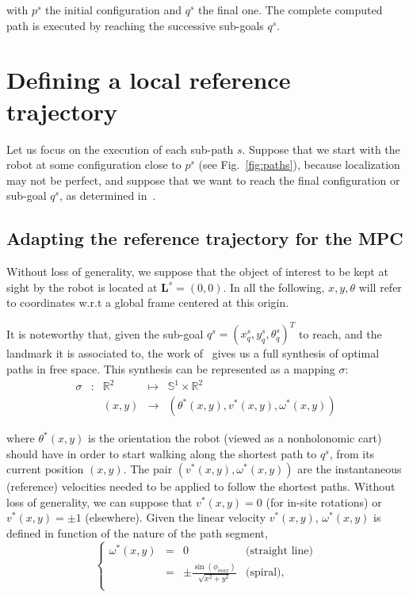 with $p^s$ the initial configuration and $q^s$ the final one. The complete computed path is executed by reaching the successive sub-goals $q^s$.


\section{Defining a local reference trajectory}

\label{sec:reftrajectories}

Let us focus on the execution of each sub-path $s$. Suppose that we start with the robot at some configuration close to $p^s$ (see Fig.~\ref{fig:paths}), because localization may not be perfect, and suppose that we want to reach the final configuration or sub-goal $q^s$, as determined in~\cite{jib-IJHR2010}.

\subsection{Adapting the reference trajectory for the MPC}

Without loss of generality, we suppose that the object of interest to be kept at sight by the robot is located at $\mathbf L^s = (0,0)$. In all the following, $x,y,\theta$ will refer to coordinates w.r.t a global frame centered at this origin.

It is noteworthy that, given the sub-goal $q^s =(x_q^s,y_q^s,\theta_q^s)^T$ to reach, and the landmark it is associated to, the work of~\cite{Salaris:2010} gives us a full synthesis of optimal paths in free space. This synthesis can be represented as a mapping $\sigma$:
$$
\begin{array}{cccccc}
\sigma & : & \mathbb{R}^2 & \mapsto & \mathbb{S}^1 \times \mathbb{R}^2\\
& & (x,y) & \rightarrow & (\theta^*(x,y),v^*(x,y),\omega^*(x,y))
\end{array}
$$

where $\theta^*(x,y)$ is the orientation the robot (viewed as a nonholonomic cart)  should have in order to start walking along the shortest path to $q^s$, from its current position $(x,y)$. The pair $(v^*(x,y),\omega^*(x,y))$ are the instantaneous (reference) velocities needed to be applied to follow the shortest paths. Without loss of generality, we can suppose that $v^*(x,y)=0$ (for in-site rotations) or $v^*(x,y)=\pm 1$ (elsewhere). Given the linear velocity $v^*(x,y)$, $\omega^*(x,y)$ is defined in function of the nature  of the path segment,
$$
\left\{
\begin{array}{cccc}
 \omega^*(x,y) & = & 0 & \mbox{(straight line)}\\
  & = & \pm\frac{\sin(\phi_{max})}{\sqrt{x^2+y^2}} & \mbox{(spiral)},\\
\end{array}
\right.
$$

